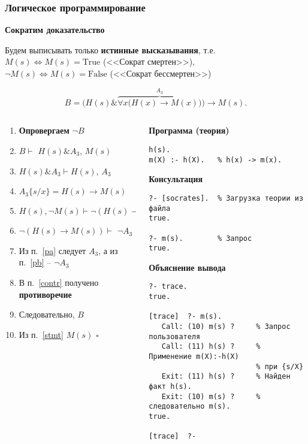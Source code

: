 \documentclass[10pt]{beamer}
\newcommand{\Tr}{\mbox{True}}
\newcommand{\Fa}{\mbox{False}}
\begin{document}
\begin{frame}[fragile]
  \frametitle{Логическое программирование}

  \textbf{Сократим доказательство}

  Будем выписывать только \textbf{истинные высказывания}, т.е.
  $M(s) \Leftrightarrow M(s) = \Tr$ (<<Сократ смертен>>),\\
  $\neg M(s) \Leftrightarrow M(s) = \Fa$ (<<Сократ бессмертен>>)

$$
B = \Big (H(s) \& \overbrace{\forall x \big ( H(x)\to M(x)\big )}^{A_3} \Big ) \to M(s).
$$

\begin{columns}
  \begin{column}{0.5\textwidth}\footnotesize
    \begin{enumerate}
    \item \textbf{Опровергаем} $\neg B$
    \item $B\vdash$ $H(s) \& A_3$, $M(s)$
    \item $H(s) \& A_3 \vdash H(s)$, {\color{red}$A_3$} \label{pa}
    \item $A_3\{s/x\} = H(s)\to M(s)$
    \item $H(s), \neg M(s) \vdash \neg (H(s)\to M(s))$
    \item $\neg(H(s)\to M(s))\vdash$ {\color{blue} $\neg A_3$} \label{pb}
    \item Из п.~\ref{pa} следует {\color{red}$A_3$}, а из п.~\ref{pb} -- {\color{blue} $\neg A_3$} \label{contr}
    \item В п.~\ref{contr} получено \textbf{противоречие}
    \item Следовательно, $B$ \label{stmt}
    \item Из п.~\ref{stmt} $M(s)$ $\square$
    \end{enumerate}
    \vspace{2.7em}
    \mbox{}
  \end{column}
  \begin{column}{0.5\textwidth}
    \textbf{\footnotesize Программа (теория)}
\begin{verbatim}
h(s).
m(X) :- h(X).   % h(x) -> m(x).
\end{verbatim}
    \textbf{\footnotesize Консультация}
\begin{verbatim}
?- [socrates].  % Загрузка теории из файла
true.

?- m(s).        % Запрос
true.
\end{verbatim}
\textbf{\footnotesize Объяснение вывода}
\begin{verbatim}
?- trace.
true.

[trace]  ?- m(s).
   Call: (10) m(s) ?     % Запрос пользователя
   Call: (11) h(s) ?     % Применение m(X):-h(X)
                         % при {s/X}
   Exit: (11) h(s) ?     % Найден факт h(s).
   Exit: (10) m(s) ?     % следовательно m(s).
true.

[trace]  ?-
\end{verbatim}
  \end{column}
\end{columns}
\end{frame}
\end{document}
